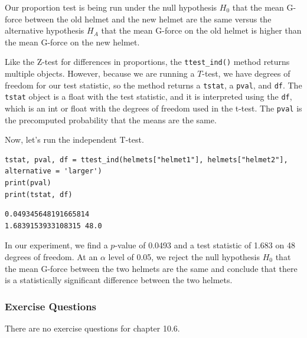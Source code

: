 Our proportion test is being run under the null hypothesis $H_0$ that the mean G-force between the old helmet and the new helmet are the same versus the alternative hypothesis $H_A$ that the mean G-force on the old helmet is higher than the mean G-force on the new helmet.\par
Like the Z-test for differences in proportions, the \verb|ttest_ind()| method returns multiple objects. However, because we are running a $T$-test, we have degrees of freedom for our test statistic, so the method returns a \verb|tstat|, a \verb|pval|, and \verb|df|. The \verb|tstat| object is a float with the test statistic, and it is interpreted using the \verb|df|, which is an int or float with the degrees of freedom used in the t-test. The \verb|pval| is the precomputed probability that the means are the same.\par
Now, let's run the independent T-test.\par
\begin{lstlisting}[style=pippython]
tstat, pval, df = ttest_ind(helmets["helmet1"], helmets["helmet2"], alternative = 'larger')
print(pval)
print(tstat, df)
\end{lstlisting}
\begin{lstlisting}[style=none]
0.049345648191665814
1.6839153933108315 48.0
\end{lstlisting}
In our experiment, we find a $p$-value of 0.0493 and a test statistic of 1.683 on 48 degrees of freedom. At an $\alpha$ level of 0.05, we reject the null hypothesis $H_0$ that the mean G-force between the two helmets are the same and conclude that there is a statistically significant difference between the two helmets.

\subsubsection*{Exercise Questions}
There are no exercise questions for chapter 10.6.

